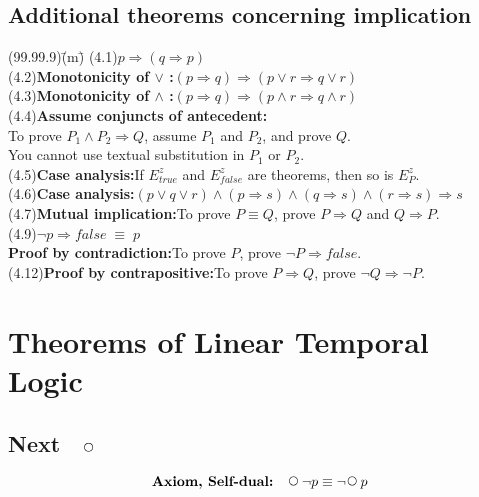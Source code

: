 \documentclass[fleqn, leqno]{article}
\newcommand{\lgap}{2pt}                             %
\newcommand{\equivs}{\ensuremath{\;\equiv\;}}       %
\newcommand{\impl}{\ensuremath{\Rightarrow}}        %
\newcommand{\Next}{\;\,\text{\raisebox{3.5pt}{\circle{6}}}}
\begin{document}
\subsection*{Additional theorems concerning implication}
\begin{tabbing}
(99.99.9)\;\=(m)\;\=\kill
(4.1)\>$p\impl (q\impl p)$\\[\lgap]
(4.2)\>\textbf{Monotonicity of $\lor$ :}\quad $(p\impl q) \impl (p\lor r \impl q\lor r)$\\[\lgap]
(4.3)\>\textbf{Monotonicity of $\land$ :}\quad $(p\impl q) \impl (p\land r \impl q\land r)$\\[\lgap]
(4.4)\>\textbf{Assume conjuncts of antecedent:}\\[\lgap]
      \>To prove $P_{1}\land P_{2}\impl Q$, assume $P_{1}$ and $P_{2}$, and prove $Q$.\\[\lgap]
      \>You cannot use textual substitution in $P_{1}$ or $P_{2}$.\\[\lgap]
(4.5)\>\textbf{Case analysis:}\quad If $E^{z}_{true}$ and $E^{z}_{false}$ are theorems, then so is $E^{z}_{P}$.\\[\lgap]
(4.6)\>\textbf{Case analysis:}\quad $(p\lor q\lor r)\land (p\impl s)\land (q\impl s)\land (r\impl s)\impl s$\\[\lgap]
(4.7)\>\textbf{Mutual implication:}\quad To prove $P\equiv Q$, prove $P\impl Q$ and $Q\impl P$.\\[\lgap]
(4.9)\>$\neg p\impl false \equivs p$\\
     \>\textbf{Proof by contradiction:}\quad To prove $P$, prove $\neg P\impl false$.\\[\lgap]
(4.12)\>\textbf{Proof by contrapositive:}\quad To prove $P\impl Q$, prove $\neg Q\impl \neg P$.\\
\end{tabbing}

\pagebreak

\section*{Theorems of Linear Temporal Logic}

\subsection*{Next $\quad\Next$}

\begin{equation}\label{E:selfDual}
\textbf{Axiom, Self-dual:}\quad \Next\neg p \equiv \neg\Next p
\end{equation}
\end{document}
